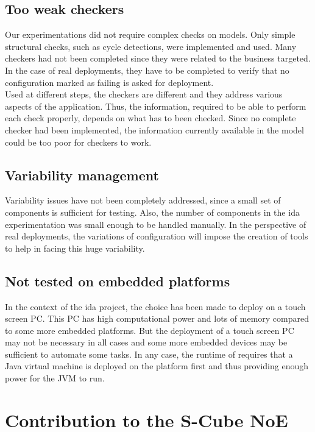 \subsection{Too weak checkers}

Our experimentations did not require complex checks on models. Only simple structural checks, such as cycle detections, were implemented and used. Many checkers had not been completed since they were related to the business targeted. In the case of real deployments, they have to be completed to verify that no configuration marked as failing is asked for deployment.\\
Used at different steps, the checkers are different and they address various aspects of the application. Thus, the information, required to be able to perform each check properly, depends on what has to been checked. Since no  complete checker had been implemented, the information currently available in the model could be too poor for checkers to work.

\subsection{Variability management}

Variability issues have not been completely addressed, since a small set of components is sufficient for testing. Also, the number of components in the \gls{ida} experimentation was small enough to be handled manually. In the perspective of real deployments, the variations of configuration will impose the creation of tools to help in facing this huge variability.

\subsection{Not tested on embedded platforms}

In the context of the \gls{ida} project, the choice has been made to deploy \enti{} on a touch screen PC. This PC has high computational power and lots of memory compared to some more embedded platforms. But the deployment of a touch screen PC may not be necessary in all cases and some more embedded devices may be sufficient to automate some tasks. In any case, the runtime of \enti{} requires that a Java virtual machine is deployed on the platform first and thus providing enough power for the JVM to run.


\section{Contribution to the S-Cube NoE}

